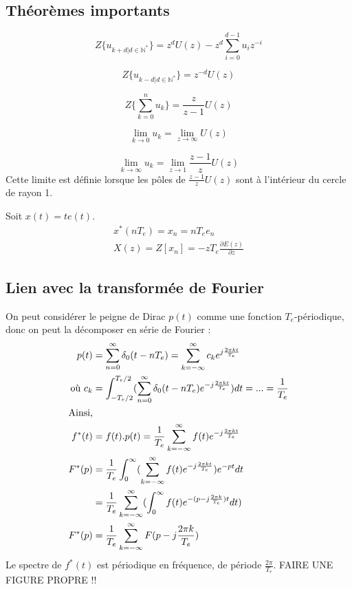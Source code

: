 \documentclass[main.tex]{subfiles}
\begin{document}
\subsection*{Théorèmes importants}
\begin{thm}
\[ Z\{u_{k+d|d\in\mathbb{N}^*}\} = z^d U(z) - z^d \sum_{i=0}^{d-1}u_iz^{-i} \]
\end{thm}
\begin{thm}
\[ Z\{u_{k-d|d\in\mathbb{N}^*}\} = z^{-d} U(z) \]
\end{thm}

\begin{thm}
\[ Z\{\sum_{k=0}^nu_k\} = \frac{z}{z-1}U(z) \]
\end{thm}

\begin{thm}
\[ \lim_{k\rightarrow 0} u_k = \lim_{z\rightarrow \infty} U(z) \]
\end{thm}

\begin{thm}
\[ \lim_{k\rightarrow \infty} u_k = \lim_{z\rightarrow 1} \frac{z-1}{z} U(z) \]
Cette limite est définie lorsque les pôles de $\frac{z-1}{z}U(z)$ sont à l'intérieur du cercle de rayon 1.
\end{thm}


\begin{prop}
Soit $x(t)=te(t)$.\\
\begin{align*}
x^*(nT_e) = x_n = nT_e e_n \\
X(z) = Z[x_n] = -z T_e \frac{\partial E(z)}{\partial z}
\end{align*}
\end{prop}

\subsection*{Lien avec la transformée de Fourier}
On peut considérer le peigne de Dirac $p(t)$ comme une fonction $T_e$-périodique, donc on peut la décomposer en série de Fourier :
\begin{align*}
p(t) & = \sum_{n=0}^{\infty} \delta_0(t-nT_e) = \sum_{k=-\infty}^{\infty} c_k e^{j\frac{2\pi k t}{T_e}} \\
\text{où } c_k & = \int_{-T_e/2}^{T_e/2} (\sum_{n=0}^{\infty} \delta_0(t-nT_e)e^{-j \frac{2\pi kt}{T_e}})dt = ... = \frac{1}{T_e}  \\
\intertext{Ainsi,}
 f^*(t) & = f(t).p(t) = \frac{1}{T_e} \sum_{k=-\infty}^{\infty}f(t)e^{-j\frac{2\pi kt}{T_e}} \\
F^*(p) & = \frac{1}{T_e} \int_0^{\infty} ( \sum_{k=-\infty}^{\infty}f(t)e^{-j\frac{2\pi kt}{T_e}} ) e^{-pt}dt \\
& = \frac{1}{T_e} \sum_{k=-\infty}^{\infty} (\int_0^{\infty} f(t) e^{-(p-j\frac{2\pi k}{T_e})t}dt) \\
F^*(p) &= \frac{1}{T_e} \sum_{k=- \infty}^{\infty}F(p-j\frac{2\pi k}{T_e})
\end{align*}
Le spectre de $f^*(t)$ est périodique en fréquence, de période $\frac{2\pi}{T_e}$.
FAIRE UNE FIGURE PROPRE !!
\end{document}
